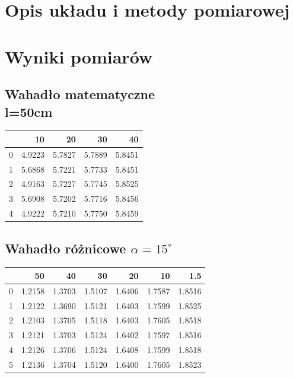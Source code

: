 \documentclass[a4paper,10pt]{article}
\begin{document}
\section{Opis układu i metody pomiarowej}


\section{Wyniki pomiarów}
\subsection{Wahadło matematyczne\\l=50cm}
\begin{tabular}{lrrrr}
\toprule
{} &      10 &      20 &      30 &      40 \\
\midrule
0 &  4.9223 &  5.7827 &  5.7889 &  5.8451 \\
1 &  5.6868 &  5.7221 &  5.7733 &  5.8451 \\
2 &  4.9163 &  5.7227 &  5.7745 &  5.8525 \\
3 &  5.6908 &  5.7202 &  5.7716 &  5.8456 \\
4 &  4.9222 &  5.7210 &  5.7750 &  5.8459 \\
\bottomrule
\end{tabular}
\subsection{Wahadło różnicowe $\alpha = 15^\circ$}
\begin{tabular}{lrrrrrr}
\toprule
{} &      50 &      40 &      30 &      20 &      10 &     1.5 \\
\midrule
0 &  1.2158 &  1.3703 &  1.5107 &  1.6406 &  1.7587 &  1.8516 \\
1 &  1.2122 &  1.3690 &  1.5121 &  1.6403 &  1.7599 &  1.8525 \\
2 &  1.2103 &  1.3705 &  1.5118 &  1.6403 &  1.7605 &  1.8518 \\
3 &  1.2121 &  1.3703 &  1.5124 &  1.6402 &  1.7597 &  1.8516 \\
4 &  1.2126 &  1.3706 &  1.5124 &  1.6408 &  1.7599 &  1.8518 \\
5 &  1.2136 &  1.3704 &  1.5120 &  1.6400 &  1.7605 &  1.8523 \\
\bottomrule
\end{tabular}
\end{document}
